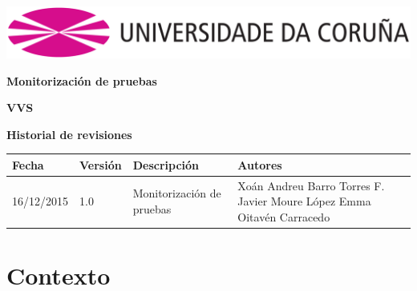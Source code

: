\documentclass[12pt, a4paper, titlepage]{article}
\begin{document}
	
	
	\begin{titlepage}
		
		\includegraphics[width=15cm]{Imagenes/Simbolo_logo_UDC.png}
		
		\vspace{6cm}
		
		\begin{flushright}
			
			\LARGE{\textbf{Monitorización de pruebas}}
			
			\large{\textbf{VVS}}
		\end{flushright}
		
		\vspace{3cm}
		\begin{center}
			\large{\textbf{Historial de revisiones}}
			
			\begin{tabular}{ | p{3cm} | p{2cm} | p{4cm} | p{6cm} |}
				\hline
				\textbf{Fecha} & \textbf{Versión} & \textbf{Descripción} & \textbf{Autores} \\ \hline
				16/12/2015 &  1.0 &  Monitorización de pruebas & Xoán Andreu Barro Torres \newline F. Javier Moure López \newline Emma Oitavén Carracedo \\ \hline
			\end{tabular}
		\end{center}
		
	\end{titlepage}
	\clearpage
	
	
	\tableofcontents
	\newpage
	
	\section{Contexto}
	
\end{document}
